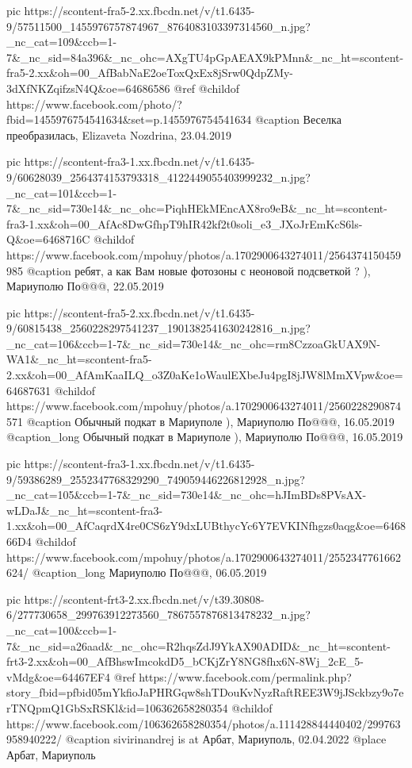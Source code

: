      pic https://scontent-fra5-2.xx.fbcdn.net/v/t1.6435-9/57511500_1455976757874967_8764083103397314560_n.jpg?_nc_cat=109&ccb=1-7&_nc_sid=84a396&_nc_ohc=AXgTU4pGpAEAX9kPMnn&_nc_ht=scontent-fra5-2.xx&oh=00_AfBabNaE2oeToxQxEx8jSrw0QdpZMy-3dXfNKZqifzsN4Q&oe=64686586
     @ref 
     @childof https://www.facebook.com/photo/?fbid=1455976754541634&set=p.1455976754541634
     @caption Веселка преобразилась, Elizaveta Nozdrina, 23.04.2019

     pic https://scontent-fra3-1.xx.fbcdn.net/v/t1.6435-9/60628039_2564374153793318_4122449055403999232_n.jpg?_nc_cat=101&ccb=1-7&_nc_sid=730e14&_nc_ohc=PiqhHEkMEncAX8ro9eB&_nc_ht=scontent-fra3-1.xx&oh=00_AfAc8DwGfhpT9hIR42kf2t0soli_e3_JXoJrEmKcS6ls-Q&oe=6468716C
     @childof https://www.facebook.com/mpohuy/photos/a.1702900643274011/2564374150459985
     @caption ребят, а как Вам новые фотозоны с неоновой подсветкой ? ), Мариуполю По@@@, 22.05.2019

     pic https://scontent-fra5-2.xx.fbcdn.net/v/t1.6435-9/60815438_2560228297541237_1901382541630242816_n.jpg?_nc_cat=106&ccb=1-7&_nc_sid=730e14&_nc_ohc=rm8CzzoaGkUAX9N-WA1&_nc_ht=scontent-fra5-2.xx&oh=00_AfAmKaaILQ_o3Z0aKe1oWaulEXbeJu4pgI8jJW8lMmXVpw&oe=64687631
     @childof https://www.facebook.com/mpohuy/photos/a.1702900643274011/2560228290874571
     @caption Обычный подкат в Мариуполе ), Мариуполю По@@@, 16.05.2019
     @caption_long Обычный подкат в Мариуполе ), Мариуполю По@@@, 16.05.2019

     pic https://scontent-fra3-1.xx.fbcdn.net/v/t1.6435-9/59386289_2552347768329290_749059446226812928_n.jpg?_nc_cat=105&ccb=1-7&_nc_sid=730e14&_nc_ohc=hJImBDs8PVsAX-wLDaJ&_nc_ht=scontent-fra3-1.xx&oh=00_AfCaqrdX4re0CS6zY9dxLUBthycYc6Y7EVKINfhgzs0aqg&oe=646866D4
     @childof https://www.facebook.com/mpohuy/photos/a.1702900643274011/2552347761662624/
     @caption_long Мариуполю По@@@, 06.05.2019

     pic https://scontent-frt3-2.xx.fbcdn.net/v/t39.30808-6/277730658_299763912273560_7867557876813478232_n.jpg?_nc_cat=100&ccb=1-7&_nc_sid=a26aad&_nc_ohc=R2hqsZdJ9YkAX90ADID&_nc_ht=scontent-frt3-2.xx&oh=00_AfBhswImcokdD5_bCKjZrY8NG8fhx6N-8Wj_2cE_5-vMdg&oe=64467EF4
     @ref https://www.facebook.com/permalink.php?story_fbid=pfbid05mYkfioJaPHRGqw8shTDouKvNyzRaftREE3W9jJSckbzy9o7erTNQpmQ1GbSxRSKl&id=106362658280354
     @childof https://www.facebook.com/106362658280354/photos/a.111428844440402/299763958940222/
     @caption sivirinandrej is at Арбат, Мариуполь, 02.04.2022
     @place Арбат, Мариуполь
     
